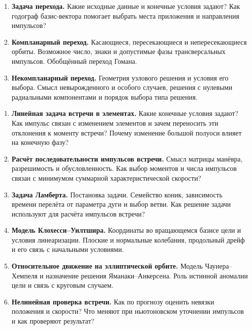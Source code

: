 \documentclass[11pt,a4paper]{article}
\begin{document}
\begin{enumerate}[resume=topics]
\item \textbf{Задача перехода.} Какие исходные данные и конечные условия
задают? Как годограф базис-вектора помогает выбрать места приложения
и направления импульсов?
\item \textbf{Компланарный переход.} Касающиеся, пересекающиеся и непересекающиеся
орбиты. Возможное число, знаки и допустимые фазы трансверсальных импульсов.
Обобщённый переход Гомана.
\item \textbf{Некомпланарный переход.} Геометрия узлового решения и условия
его выбора. Смысл невырожденного и особого случаев, решения с нулевыми
радиальными компонентами и порядок выбора типа решения.
\end{enumerate}

\newpage
{}
\begin{enumerate}[resume=topics]
\item \textbf{Линейная задача встречи в элементах.} Какие конечные условия
задают? Как импульс связан с изменением элементов и зачем
переносить эти отклонения к моменту встречи? Почему изменение большой полуоси
влияет на конечную фазу?
\item \textbf{Расчёт последовательности импульсов встречи.} Смысл матрицы
манёвра, разрешимость и обусловленность. Как выбор моментов и числа
импульсов связан с минимумом суммарной характеристической скорости?
\item \textbf{Задача Ламберта.} Постановка задачи. Семейство коник,
зависимость времени перелёта от параметра дуги и выбор ветви.
Как решение задачи используют для расчёта импульсов встречи?
\item \textbf{Модель Клохесси--Уилтшира.} Координаты во вращающемся базисе
цели и условия линеаризации. Плоские и нормальные колебания, продольный
дрейф и его связь с начальными условиями.
\item \textbf{Относительное движение на эллиптической орбите.} Модель
Чаунера--Хемпеля и назначение решения Яманаки--Анкерсена. Роль истинной аномалии
цели и связь с круговым случаем.
\item \textbf{Нелинейная проверка встречи.} Как по прогнозу оценить невязки
положения и скорости? Что меняют при ньютоновском уточнении импульсов
и как проверяют результат?
\end{enumerate}
\end{document}
